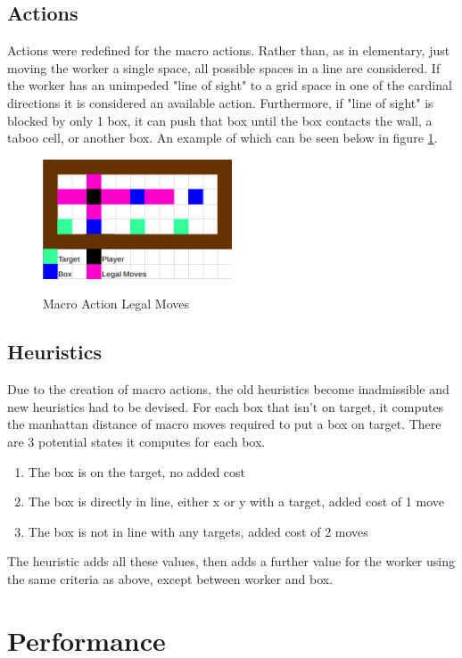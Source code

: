 \documentclass[]{article}
\begin{document}
\subsection{Actions}
Actions were redefined for the macro actions. Rather than, as in elementary, just moving the worker a single space, all possible spaces in a line are considered. If the worker has an unimpeded "line of sight" to a grid space in one of the cardinal directions it is considered an available action. Furthermore, if "line of sight" is blocked by only 1 box, it can push that box until the box contacts the wall, a taboo cell, or another box. An example of which can be seen below in figure \ref{MacroAction}.
\begin{figure}[H]
	\centering
	\caption{Macro Action Legal Moves}
	\includegraphics[width=0.5\textwidth]{MacroAction.png}
	\label{MacroAction}
\end{figure}
\newpage
\subsection{Heuristics}
Due to the creation of macro actions, the old heuristics become inadmissible and new heuristics had to be devised. For each box that isn't on target, it computes the manhattan distance of macro moves required to put a box on target. There are 3 potential states it computes for each box.
\begin{enumerate}
	\item The box is on the target, no added cost
	\item The box is directly in line, either x or y with a target, added cost of 1 move
	\item The box is not in line with any targets, added cost of 2 moves
\end{enumerate}
The heuristic adds all these values, then adds a further value for the worker using the same criteria as above, except between worker and box.
\section{Performance}
\end{document}
